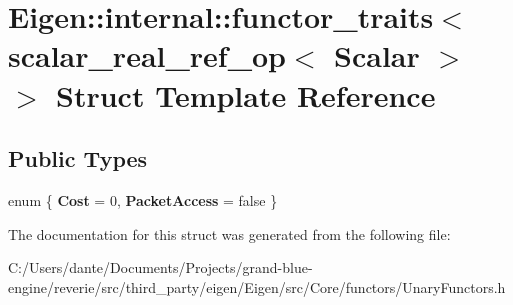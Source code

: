 \hypertarget{struct_eigen_1_1internal_1_1functor__traits_3_01scalar__real__ref__op_3_01_scalar_01_4_01_4}{}\section{Eigen\+::internal\+::functor\+\_\+traits$<$ scalar\+\_\+real\+\_\+ref\+\_\+op$<$ Scalar $>$ $>$ Struct Template Reference}
\label{struct_eigen_1_1internal_1_1functor__traits_3_01scalar__real__ref__op_3_01_scalar_01_4_01_4}
\subsection*{Public Types}
\begin{DoxyCompactItemize}
\item 
\mbox{\label{struct_eigen_1_1internal_1_1functor__traits_3_01scalar__real__ref__op_3_01_scalar_01_4_01_4_a9bf2d2c8f5c88acc1481307d0d3618dd}} 
enum \{ {\bfseries Cost} = 0, 
{\bfseries Packet\+Access} = false
 \}
\end{DoxyCompactItemize}


The documentation for this struct was generated from the following file\+:\begin{DoxyCompactItemize}
\item 
C\+:/\+Users/dante/\+Documents/\+Projects/grand-\/blue-\/engine/reverie/src/third\+\_\+party/eigen/\+Eigen/src/\+Core/functors/Unary\+Functors.\+h\end{DoxyCompactItemize}
